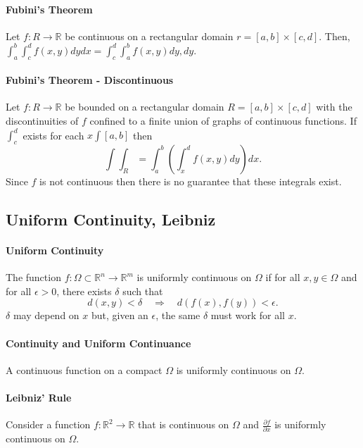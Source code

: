 \paragraph{Fubini's Theorem}
Let \(f: R \to \mathbb{R}\) be continuous on a rectangular domain \(r = [a, b]\times [c, d]\).
Then, \(\int_a^b \int_c^d f(x, y) dy dx = \int_c^d \int_a^b f(x, y) dy, dy\).

\paragraph{Fubini's Theorem - Discontinuous}
Let \(f: R \to \mathbb{R}\) be bounded on a rectangular domain
\(R = [a, b] \times [c, d]\) with the discontinuities of \(f\) confined to
a finite union of graphs of continuous functions.
If \(\int_c^d\) exists for each \(x\int [a, b]\) then
\[\int\int_R = \int_a^b \left(\int_x^d f(x, y) dy\right) dx.\]
Since \(f\) is not continuous then there is no guarantee that these integrals exist.


\subsection{Uniform Continuity, Leibniz}

\paragraph{Uniform Continuity}
The function \(f: \Omega\subset \mathbb{R}^n \to \mathbb{R}^m\)
is uniformly continuous on \(\Omega\) if for all \(x, y\in\Omega\) and
for all \(\epsilon > 0\), there exists \(\delta\) such that
\[
    d(x, y) < \delta \quad \Rightarrow \quad d(f(x), f(y)) < \epsilon.
\]
\(\delta\) may depend on \(x\) but, given an \(\epsilon\),
the same \(\delta\) must work for all \(x\).

\paragraph{Continuity and Uniform Continuance}
A continuous function on a compact \(\Omega\) is uniformly continuous on \(\Omega\).

\paragraph{Leibniz' Rule}
Consider a function \(f: \mathbb{R}^2 \to \mathbb{R}\) that is continuous
on \(\Omega\) and \(\frac{\partial f}{\partial x}\) is uniformly continuous on \(\Omega\).

